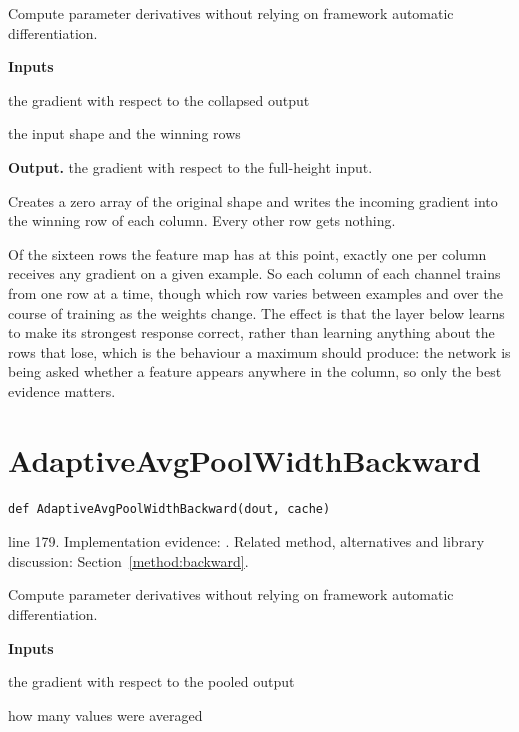 Compute parameter derivatives without relying on framework automatic differentiation.




\noindent\textbf{Inputs}
\begin{description}[leftmargin=2.2em,style=nextline,font=\normalfont\ttfamily]\setlength\itemsep{1pt}
  \item[{dout}] \normalfont the gradient with respect to the collapsed output
  \item[{cache}] \normalfont the input shape and the winning rows
\end{description}

\noindent\textbf{Output.} the gradient with respect to the full-height input.


Creates a zero array of the original shape and writes the incoming gradient into the winning row of each column. Every other row gets nothing.


Of the sixteen rows the feature map has at this point, exactly one per column receives any gradient on a given example. So each column of each channel trains from one row at a time, though which row varies between examples and over the course of training as the weights change. The effect is that the layer below learns to make its strongest response correct, rather than learning anything about the rows that lose, which is the behaviour a maximum should produce: the network is being asked whether a feature appears anywhere in the column, so only the best evidence matters.



\section{AdaptiveAvgPoolWidthBackward}\label{fn:train:AdaptiveAvgPoolWidthBackward}
\begin{lstlisting}[style=sig]
def AdaptiveAvgPoolWidthBackward(dout, cache)
\end{lstlisting}
 line 179. Implementation evidence: \cite{code2026}. Related method, alternatives and library discussion: Section~\ref{method:backward}.


Compute parameter derivatives without relying on framework automatic differentiation.




\noindent\textbf{Inputs}
\begin{description}[leftmargin=2.2em,style=nextline,font=\normalfont\ttfamily]\setlength\itemsep{1pt}
  \item[{dout}] \normalfont the gradient with respect to the pooled output
  \item[{cache}] \normalfont how many values were averaged
\end{description}


